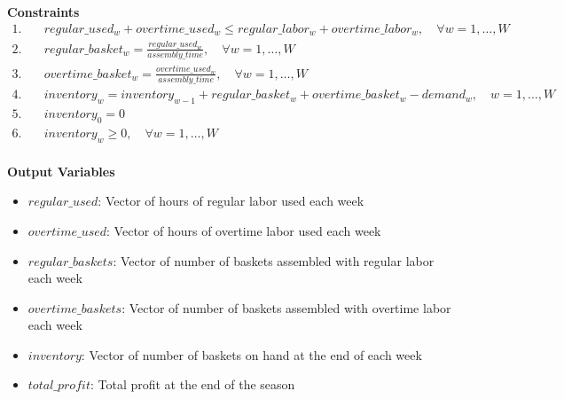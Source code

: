\documentclass{article}
\begin{document}
\textbf{Constraints}
\begin{align*}
1. & \quad regular\_used_w + overtime\_used_w \leq regular\_labor_w + overtime\_labor_w, \quad \forall w = 1, \ldots, W \\
2. & \quad regular\_basket_w = \frac{regular\_used_w}{assembly\_time}, \quad \forall w = 1, \ldots, W \\
3. & \quad overtime\_basket_w = \frac{overtime\_used_w}{assembly\_time}, \quad \forall w = 1, \ldots, W \\
4. & \quad inventory_w = inventory_{w-1} + regular\_basket_w + overtime\_basket_w - demand_w, \quad w = 1, \ldots, W \\
5. & \quad inventory_0 = 0 \\
6. & \quad inventory_w \geq 0, \quad \forall w = 1, \ldots, W \\
\end{align*}

\textbf{Output Variables}
\begin{itemize}
    \item $regular\_used$: Vector of hours of regular labor used each week
    \item $overtime\_used$: Vector of hours of overtime labor used each week
    \item $regular\_baskets$: Vector of number of baskets assembled with regular labor each week
    \item $overtime\_baskets$: Vector of number of baskets assembled with overtime labor each week
    \item $inventory$: Vector of number of baskets on hand at the end of each week
    \item $total\_profit$: Total profit at the end of the season
\end{itemize}
\end{document}
